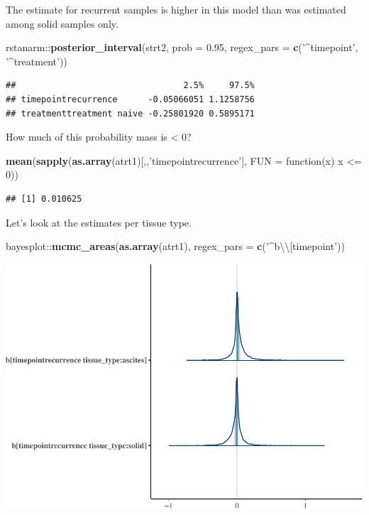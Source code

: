 \documentclass[]{article}
\newenvironment{Shaded}{\begin{snugshade}}{\end{snugshade}}
\newcommand{\KeywordTok}[1]{\textcolor[rgb]{0.13,0.29,0.53}{\textbf{{#1}}}}
\newcommand{\DataTypeTok}[1]{\textcolor[rgb]{0.13,0.29,0.53}{{#1}}}
\newcommand{\DecValTok}[1]{\textcolor[rgb]{0.00,0.00,0.81}{{#1}}}
\newcommand{\FloatTok}[1]{\textcolor[rgb]{0.00,0.00,0.81}{{#1}}}
\newcommand{\CharTok}[1]{\textcolor[rgb]{0.31,0.60,0.02}{{#1}}}
\newcommand{\StringTok}[1]{\textcolor[rgb]{0.31,0.60,0.02}{{#1}}}
\newcommand{\NormalTok}[1]{{#1}}
\begin{document}
The estimate for recurrent samples is higher in this model than was
estimated among solid samples only.

\begin{Shaded}
\begin{Highlighting}[]
\NormalTok{rstanarm::}\KeywordTok{posterior_interval}\NormalTok{(strt2, }\DataTypeTok{prob =} \FloatTok{0.95}\NormalTok{, }\DataTypeTok{regex_pars =} \KeywordTok{c}\NormalTok{(}\StringTok{'^timepoint'}\NormalTok{, }\StringTok{'^treatment'}\NormalTok{))}
\end{Highlighting}
\end{Shaded}

\begin{verbatim}
##                                 2.5%     97.5%
## timepointrecurrence      -0.05066051 1.1258756
## treatmenttreatment naive -0.25801920 0.5895171
\end{verbatim}

How much of this probability mass is \textless{} 0?

\begin{Shaded}
\begin{Highlighting}[]
\KeywordTok{mean}\NormalTok{(}\KeywordTok{sapply}\NormalTok{(}\KeywordTok{as.array}\NormalTok{(atrt1)[,,}\StringTok{'timepointrecurrence'}\NormalTok{], }\DataTypeTok{FUN =} \NormalTok{function(x) x <=}\StringTok{ }\DecValTok{0}\NormalTok{))}
\end{Highlighting}
\end{Shaded}

\begin{verbatim}
## [1] 0.010625
\end{verbatim}

Let's look at the estimates per tissue type.

\begin{Shaded}
\begin{Highlighting}[]
\NormalTok{bayesplot::}\KeywordTok{mcmc_areas}\NormalTok{(}\KeywordTok{as.array}\NormalTok{(atrt1), }\DataTypeTok{regex_pars =} \KeywordTok{c}\NormalTok{(}\StringTok{'^b}\CharTok{\textbackslash{}\textbackslash{}}\StringTok{[timepoint'}\NormalTok{))}
\end{Highlighting}
\end{Shaded}

\includegraphics{Hierarchical_model_mutations_and_peptides_files/figure-latex/allsamp-atrt1-coefplot-timepoint-by-tissue-type-1.pdf}
\end{document}
